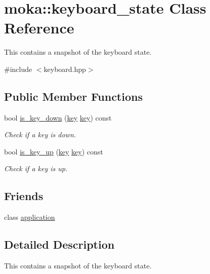 \hypertarget{classmoka_1_1keyboard__state}{}\section{moka\+::keyboard\+\_\+state Class Reference}
\label{classmoka_1_1keyboard__state}


This contains a snapshot of the keyboard state.  




{\ttfamily \#include $<$keyboard.\+hpp$>$}

\subsection*{Public Member Functions}
\begin{DoxyCompactItemize}
\item 
bool \mbox{\hyperlink{classmoka_1_1keyboard__state_a00bbf0b16f7e0f06e0f3699f8a5f88d2}{is\+\_\+key\+\_\+down}} (\mbox{\hyperlink{namespacemoka_a45a36b05a9b9eddb028d6c60305ae71d}{key}} \mbox{\hyperlink{namespacemoka_a45a36b05a9b9eddb028d6c60305ae71d}{key}}) const
\begin{DoxyCompactList}\small\item\em Check if a key is down. \end{DoxyCompactList}\item 
bool \mbox{\hyperlink{classmoka_1_1keyboard__state_afb05ac80eaa7fde852f03e260e82f94a}{is\+\_\+key\+\_\+up}} (\mbox{\hyperlink{namespacemoka_a45a36b05a9b9eddb028d6c60305ae71d}{key}} \mbox{\hyperlink{namespacemoka_a45a36b05a9b9eddb028d6c60305ae71d}{key}}) const
\begin{DoxyCompactList}\small\item\em Check if a key is up. \end{DoxyCompactList}\end{DoxyCompactItemize}
\subsection*{Friends}
\begin{DoxyCompactItemize}
\item 
class \mbox{\hyperlink{classmoka_1_1keyboard__state_a5b97104505447c42689b96b15027d832}{application}}
\end{DoxyCompactItemize}


\subsection{Detailed Description}
This contains a snapshot of the keyboard state. 

